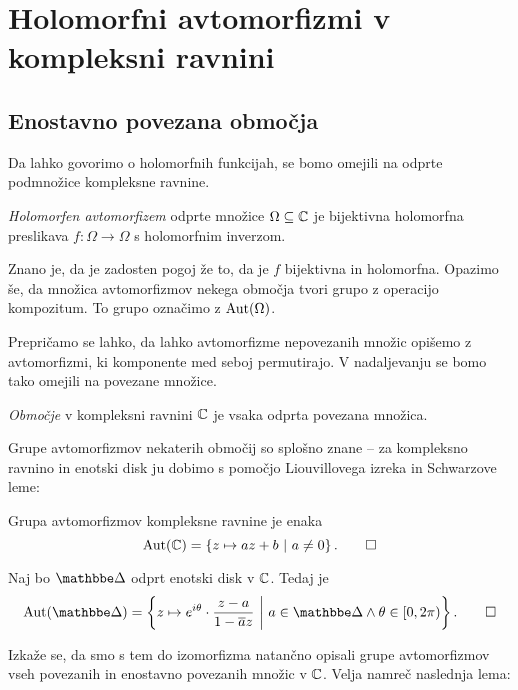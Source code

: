 \section{Holomorfni avtomorfizmi v kompleksni ravnini}

\subsection{Enostavno povezana območja}

Da lahko govorimo o holomorfnih funkcijah, se bomo omejili na
odprte podmnožice kompleksne ravnine.

\begin{definicija}
\emph{Holomorfen avtomorfizem} odprte množice $\Omega \subseteq \mathbb{C}$
je bijektivna holomorfna preslikava $f \colon \Omega \to \Omega$ s
holomorfnim inverzom.
\end{definicija}

Znano je, da je zadosten pogoj že to, da je $f$ bijektivna in
holomorfna. Opazimo še, da množica avtomorfizmov nekega območja
tvori grupo z operacijo kompozitum. To grupo označimo z
$\operatorname{Aut}(\Omega)$.

Prepričamo se lahko, da lahko avtomorfizme nepovezanih množic
opišemo z avtomorfizmi, ki komponente med seboj permutirajo. V
nadaljevanju se bomo tako omejili na povezane množice.

\begin{definicija}
\emph{Območje} v kompleksni ravnini $\mathbb{C}$ je vsaka odprta povezana
množica.
\end{definicija}

Grupe avtomorfizmov nekaterih območij so splošno znane -- za
kompleksno ravnino in enotski disk ju dobimo s pomočjo
Liouvillovega izreka in Schwarzove leme:

\begin{zgled}
Grupa avtomorfizmov kompleksne ravnine je enaka
\[
\operatorname{Aut}(\mathbb{C}) = \left\{z \mapsto az + b~\middle\vert~a \ne 0\right\}. \qedhere
\]
\end{zgled}

\begin{zgled}
Naj bo $\dsk$ odprt enotski disk v $\mathbb{C}$. Tedaj je
\[
\Aut(\dsk) =
\setb{z \mapsto e^{i \theta} \cdot \frac{z-a}{1 - \oline{a} z}}
{a \in \dsk \land \theta \in [0, 2\pi)}. \qedhere
\]
\end{zgled}



Izkaže se, da smo s tem do izomorfizma natančno opisali grupe
avtomorfizmov vseh povezanih in enostavno povezanih množic v $\mathbb{C}$.
Velja namreč naslednja lema:

